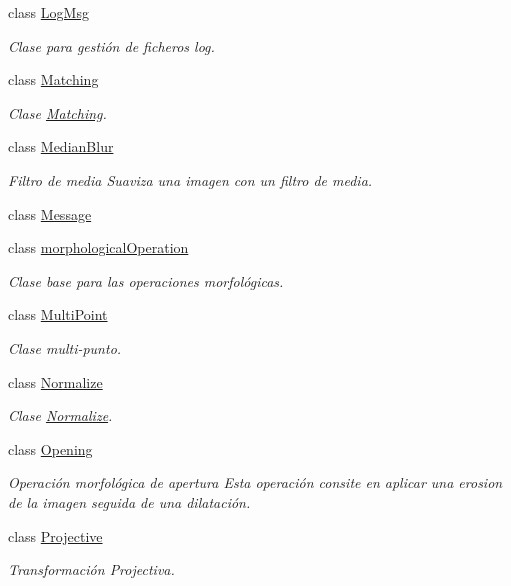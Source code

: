 \begin{DoxyCompactItemize}
class \hyperlink{class_i3_d_1_1_log_msg}{Log\+Msg}
\begin{DoxyCompactList}\small\item\em Clase para gestión de ficheros log. \end{DoxyCompactList}\item 
class \hyperlink{class_i3_d_1_1_matching}{Matching}
\begin{DoxyCompactList}\small\item\em Clase \hyperlink{class_i3_d_1_1_matching}{Matching}. \end{DoxyCompactList}\item 
class \hyperlink{class_i3_d_1_1_median_blur}{Median\+Blur}
\begin{DoxyCompactList}\small\item\em Filtro de media Suaviza una imagen con un filtro de media. \end{DoxyCompactList}\item 
class \hyperlink{class_i3_d_1_1_message}{Message}
\item 
class \hyperlink{class_i3_d_1_1morphological_operation}{morphological\+Operation}
\begin{DoxyCompactList}\small\item\em Clase base para las operaciones morfológicas. \end{DoxyCompactList}\item 
class \hyperlink{class_i3_d_1_1_multi_point}{Multi\+Point}
\begin{DoxyCompactList}\small\item\em Clase multi-\/punto. \end{DoxyCompactList}\item 
class \hyperlink{class_i3_d_1_1_normalize}{Normalize}
\begin{DoxyCompactList}\small\item\em Clase \hyperlink{class_i3_d_1_1_normalize}{Normalize}. \end{DoxyCompactList}\item 
class \hyperlink{class_i3_d_1_1_opening}{Opening}
\begin{DoxyCompactList}\small\item\em Operación morfológica de apertura Esta operación consite en aplicar una erosion de la imagen seguida de una dilatación. \end{DoxyCompactList}\item 
class \hyperlink{class_i3_d_1_1_projective}{Projective}
\begin{DoxyCompactList}\small\item\em Transformación Projectiva. \end{DoxyCompactList}\item 

\end{DoxyCompactItemize}
